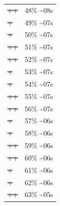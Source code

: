 \documentclass[12pt]{article}
\begin{document}
\begin{center}
\begin{tabular}{ll}
\sout{\sout{\sout{\sout{\sout{\sout{\sout{\sout{\sout{\sout{\sout{++}}}}}}}}}}} & 48\% \textasciitilde{}08s\\
\sout{\sout{\sout{\sout{\sout{\sout{\sout{\sout{\sout{\sout{\sout{\sout{+}}}}}}}}}}}} & 49\% \textasciitilde{}07s\\
\sout{\sout{\sout{\sout{\sout{\sout{\sout{\sout{\sout{\sout{\sout{\sout{+}}}}}}}}}}}} & 50\% \textasciitilde{}07s\\
\sout{\sout{\sout{\sout{\sout{\sout{\sout{\sout{\sout{\sout{\sout{\sout{++}}}}}}}}}}}} & 51\% \textasciitilde{}07s\\
\sout{\sout{\sout{\sout{\sout{\sout{\sout{\sout{\sout{\sout{\sout{\sout{++}}}}}}}}}}}} & 52\% \textasciitilde{}07s\\
\sout{\sout{\sout{\sout{\sout{\sout{\sout{\sout{\sout{\sout{\sout{\sout{\sout{+}}}}}}}}}}}}} & 53\% \textasciitilde{}07s\\
\sout{\sout{\sout{\sout{\sout{\sout{\sout{\sout{\sout{\sout{\sout{\sout{\sout{+}}}}}}}}}}}}} & 54\% \textasciitilde{}07s\\
\sout{\sout{\sout{\sout{\sout{\sout{\sout{\sout{\sout{\sout{\sout{\sout{\sout{++}}}}}}}}}}}}} & 55\% \textasciitilde{}07s\\
\sout{\sout{\sout{\sout{\sout{\sout{\sout{\sout{\sout{\sout{\sout{\sout{\sout{++}}}}}}}}}}}}} & 56\% \textasciitilde{}07s\\
\sout{\sout{\sout{\sout{\sout{\sout{\sout{\sout{\sout{\sout{\sout{\sout{\sout{\sout{+}}}}}}}}}}}}}} & 57\% \textasciitilde{}06s\\
\sout{\sout{\sout{\sout{\sout{\sout{\sout{\sout{\sout{\sout{\sout{\sout{\sout{\sout{+}}}}}}}}}}}}}} & 58\% \textasciitilde{}06s\\
\sout{\sout{\sout{\sout{\sout{\sout{\sout{\sout{\sout{\sout{\sout{\sout{\sout{\sout{++}}}}}}}}}}}}}} & 59\% \textasciitilde{}06s\\
\sout{\sout{\sout{\sout{\sout{\sout{\sout{\sout{\sout{\sout{\sout{\sout{\sout{\sout{++}}}}}}}}}}}}}} & 60\% \textasciitilde{}06s\\
\sout{\sout{\sout{\sout{\sout{\sout{\sout{\sout{\sout{\sout{\sout{\sout{\sout{\sout{\sout{+}}}}}}}}}}}}}}} & 61\% \textasciitilde{}06s\\
\sout{\sout{\sout{\sout{\sout{\sout{\sout{\sout{\sout{\sout{\sout{\sout{\sout{\sout{\sout{+}}}}}}}}}}}}}}} & 62\% \textasciitilde{}06s\\
\sout{\sout{\sout{\sout{\sout{\sout{\sout{\sout{\sout{\sout{\sout{\sout{\sout{\sout{\sout{++}}}}}}}}}}}}}}} & 63\% \textasciitilde{}05s\\

\end{tabular}
\end{center}
\end{document}
